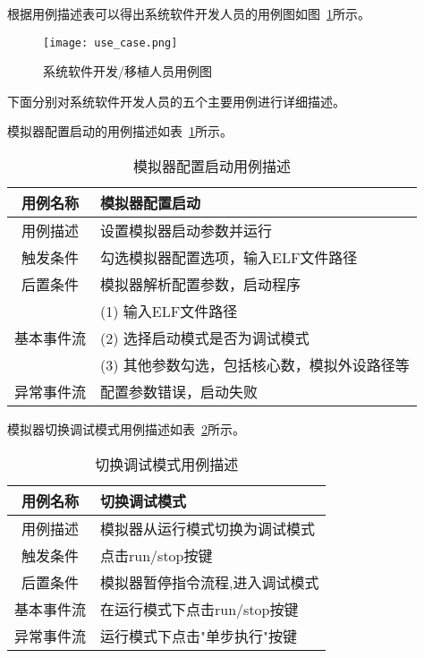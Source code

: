 根据用例描述表可以得出系统软件开发人员的用例图如图~\ref{fig:use-case}所示。
\begin{figure}[H]
  \centering
  \texttt{[image: use\_case.png]}
  \caption{系统软件开发/移植人员用例图}
  \label{fig:use-case}
\end{figure}


下面分别对系统软件开发人员的五个主要用例进行详细描述。 


模拟器配置启动的用例描述如表~\ref{tab:yongli1}所示。
\begin{table}[H]
  \centering
  \caption{模拟器配置启动用例描述}
  \label{tab:yongli1}
  \renewcommand\arraystretch{1.1}
  \begin{tabular}{cl}
    \toprule
用例名称 &	模拟器配置启动\\
    \midrule
用例描述 &	\multicolumn{1}{p{9cm}}{设置模拟器启动参数并运行}\\ \hline
触发条件 &	\multicolumn{1}{p{9cm}}{勾选模拟器配置选项，输入ELF文件路径}\\ \hline
后置条件 &	\multicolumn{1}{p{9cm}}{模拟器解析配置参数，启动程序}\\ \hline
	& \multicolumn{1}{p{9cm}}{(1)	输入ELF文件路径} \\
  基本事件流 & \multicolumn{1}{p{9cm}}{(2)	选择启动模式是否为调试模式} \\
 & \multicolumn{1}{p{9cm}}{(3)	其他参数勾选，包括核心数，模拟外设路径等}\\ \hline
异常事件流	& \multicolumn{1}{p{9cm}}{配置参数错误，启动失败}\\
    \bottomrule
  \end{tabular}
\end{table}


模拟器切换调试模式用例描述如表~\ref{tab:yongli2}所示。
\begin{table}[H]
  \centering
  \caption{切换调试模式用例描述}
  \label{tab:yongli2}
  \renewcommand\arraystretch{1.1}
  \begin{tabular}{cl}
    \toprule
用例名称	& 切换调试模式\\
    \midrule
用例描述	& \multicolumn{1}{p{9cm}}{模拟器从运行模式切换为调试模式}\\ \hline
触发条件	& \multicolumn{1}{p{9cm}}{点击run/stop按键}\\ \hline
后置条件	& \multicolumn{1}{p{9cm}}{模拟器暂停指令流程,进入调试模式}\\ \hline
基本事件流	& \multicolumn{1}{p{9cm}}{在运行模式下点击run/stop按键}\\ \hline
异常事件流	& \multicolumn{1}{p{9cm}}{运行模式下点击"单步执行"按键}\\
    \bottomrule
  \end{tabular}
\end{table}


